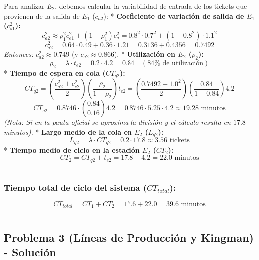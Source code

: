 \documentclass[
]{article}
\begin{document}
Para analizar \(E_2\), debemos calcular la variabilidad de entrada de
los tickets que provienen de la salida de \(E_1\) (\(c_{a2}\)): *
\textbf{Coeficiente de variación de salida de \(E_1\) (\(c_{s1}^2\)):}
\[c_{a2}^2 \approx \rho_1^2 c_{e1}^2 + (1 - \rho_1^2) c_a^2 = 0.8^2 \cdot 0.7^2 + (1 - 0.8^2) \cdot 1.1^2\]
\[c_{a2}^2 = 0.64 \cdot 0.49 + 0.36 \cdot 1.21 = 0.3136 + 0.4356 = 0.7492\]
\emph{Entonces:} \(c_{a2}^2 \approx 0.749\) (y
\(c_{a2} \approx 0.866\)). * \textbf{Utilización en \(E_2\)
(\(\rho_2\)):}
\[\rho_2 = \lambda \cdot t_{e2} = 0.2 \cdot 4.2 = 0.84 \quad (84\% \text{ de utilización})\]
* \textbf{Tiempo de espera en cola (\(CT_{q2}\)):}
\[CT_{q2} = \left( \frac{c_{a2}^2 + c_{e2}^2}{2} \right) \left( \frac{\rho_2}{1 - \rho_2} \right) t_{e2} = \left( \frac{0.7492 + 1.0^2}{2} \right) \left( \frac{0.84}{1 - 0.84} \right) 4.2\]
\[CT_{q2} = 0.8746 \cdot \left( \frac{0.84}{0.16} \right) 4.2 = 0.8746 \cdot 5.25 \cdot 4.2 \approx 19.28 \text{ minutos}\]
\emph{(Nota: Si en la pauta oficial se aproxima la división y el cálculo
resulta en \(17.8\) minutos).} * \textbf{Largo medio de la cola en
\(E_2\) (\(L_{q2}\)):}
\[L_{q2} = \lambda \cdot CT_{q2} = 0.2 \cdot 17.8 \approx 3.56 \text{ tickets}\]
* \textbf{Tiempo medio de ciclo en la estación \(E_2\) (\(CT_2\)):}
\[CT_2 = CT_{q2} + t_{e2} = 17.8 + 4.2 = 22.0 \text{ minutos}\]

\begin{center}\rule{0.5\linewidth}{0.5pt}\end{center}

\hypertarget{tiempo-total-de-ciclo-del-sistema-ct_total}{%
\subsubsection{\texorpdfstring{Tiempo total de ciclo del sistema
(\(CT_{total}\)):}{Tiempo total de ciclo del sistema (CT\_\{total\}):}}\label{tiempo-total-de-ciclo-del-sistema-ct_total}}

\[CT_{total} = CT_1 + CT_2 = 17.6 + 22.0 = 39.6 \text{ minutos}\]

\begin{center}\rule{0.5\linewidth}{0.5pt}\end{center}

\hypertarget{problema-3-luxedneas-de-producciuxf3n-y-kingman---soluciuxf3n}{%
\subsection{Problema 3 (Líneas de Producción y Kingman) -
Solución}\label{problema-3-luxedneas-de-producciuxf3n-y-kingman---soluciuxf3n}}
\end{document}
